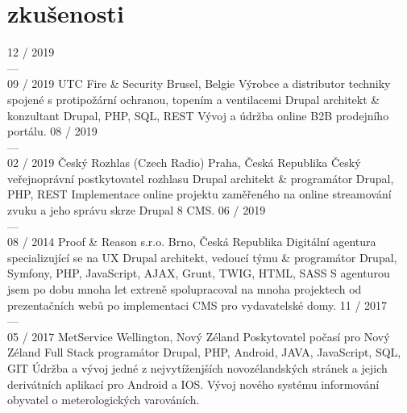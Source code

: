 \documentclass[]{friggeri-cv} %
\begin{document}

\bigskip

\section{zkušenosti}
\begin{entrylist}
  \job
  {12 / 2019 \\ --- \\ 09 / 2019}
  {UTC Fire \& Security}
  {Brusel, Belgie}
  {Výrobce a distributor techniky spojené s protipožární ochranou, topením a ventilacemi}
  {
    \position
      {Drupal architekt \& konzultant}
      {Drupal, PHP, SQL, REST}
      {
        Vývoj a údržba online B2B prodejního portálu.
      }
  }
  \job
  {08 / 2019 \\ --- \\ 02 / 2019}
  {Český Rozhlas (Czech Radio)}
  {Praha, Česká Republika}
  {Český veřejnoprávní postkytovatel rozhlasu}
  {
    \position
      {Drupal architekt \& programátor}
      {Drupal, PHP, REST}
      {
        Implementace online projektu zaměřeného na online streamování zvuku a jeho správu skrze Drupal 8 CMS.
      }
  }
  \job
  {06 / 2019 \\ --- \\ 08 / 2014}
  {Proof \& Reason s.r.o.}
  {Brno, Česká Republika}
  {Digitální agentura specializující se na UX}
  {
    \position
      {Drupal architekt, vedoucí týmu \& programátor}
      {Drupal, Symfony, PHP, JavaScript, AJAX, Grunt, TWIG, HTML, SASS}
      {
        S agenturou jsem po dobu mnoha let extreně spolupracoval na mnoha projektech od prezentačních webů po implementaci CMS
        pro vydavatelské domy.
      }
  }
  \job
  {11 / 2017 \\ --- \\ 05 / 2017}
  {MetService}
  {Wellington, Nový Zéland}
  {Poskytovatel počasí pro Nový Zéland}
  {
    \position
      {Full Stack programátor}
      {Drupal, PHP, Android, JAVA, JavaScript, SQL, GIT}
      {
        Údržba a vývoj jedné z nejvytíženjších novozélandských stránek a jejich derivátních aplikací pro Android a IOS.
        Vývoj nového systému informování obyvatel o meterologických varováních.
      }
  }
\end{entrylist}
\end{document}
